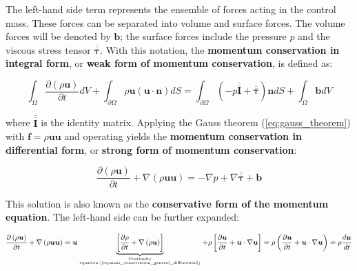 The left-hand side term represents the ensemble of forces acting in the control mass. These forces can be separated into volume and surface forces. The volume forces will be denoted by $\boldsymbol{b}$; the surface forces include the pressure $p$ and the viscous stress tensor $\overline{\overline{\pmb{\tau}}}$. With this notation, the \textbf{momentum conservation in integral form}, or \textbf{weak form of momentum conservation}, is defined as:

\begin{equation}
\label{eq:momentum_conservation_general_integral}
\boxed{
\int_\Omega \frac{\partial \left( \rho \boldsymbol{u} \right) }{\partial t} dV + \int_{\partial \Omega} \rho \boldsymbol{u} \left( \boldsymbol{u} \cdot \boldsymbol{n} \right) dS =  \int_{\partial \Omega} \left( - p \overline{\overline{\pmb{I}}} + \overline{\overline{\pmb{\tau}}} \right) \boldsymbol{n} dS + \int_\Omega \boldsymbol{b} dV
}
\end{equation}

where $\overline{\overline{\pmb{I}}}$ is the identity matrix. Applying the Gauss theorem (\ref{eq:gauss_theorem}) with $\boldsymbol{f} = \rho \boldsymbol{u} \boldsymbol{u}$ and operating yields the \textbf{momentum conservation in differential form}, or \textbf{strong form of momentum conservation}:

\begin{equation}
\label{eq:momentum_conservation_general_differential}
\boxed{
\frac{\partial \left( \rho \boldsymbol{u} \right) }{\partial t}  + \nabla \left( \rho \boldsymbol{u}  \boldsymbol{u} \right) =  - \nabla p + \nabla \overline{\overline{\pmb{\tau}}} + \boldsymbol{b} 
}
\end{equation}

This solution is also known as the \textbf{conservative form of the momentum equation}. The left-hand side can be further expanded:

\begin{equation}
\frac{\partial \left( \rho \boldsymbol{u} \right) }{\partial t}  + \nabla \left( \rho \boldsymbol{u}  \boldsymbol{u} \right) =  \boldsymbol{u} \underbrace{ \left[ \frac{\partial \rho}{\partial t} +  \nabla \left( \rho \boldsymbol{u} \right) \right]}_{\text{Continuity}\atop\text{equation (\ref{eq:mass_conservation_general_differential})}}  + \rho \left[ \frac{\partial \boldsymbol{u}}{\partial t} +  \boldsymbol{u} \cdot \nabla \boldsymbol{u} \right] = \rho \left( \frac{\partial \boldsymbol{u}}{\partial t} +  \boldsymbol{u} \cdot \nabla \boldsymbol{u} \right) = \rho \frac{d \boldsymbol{u}}{dt}
\end{equation}

